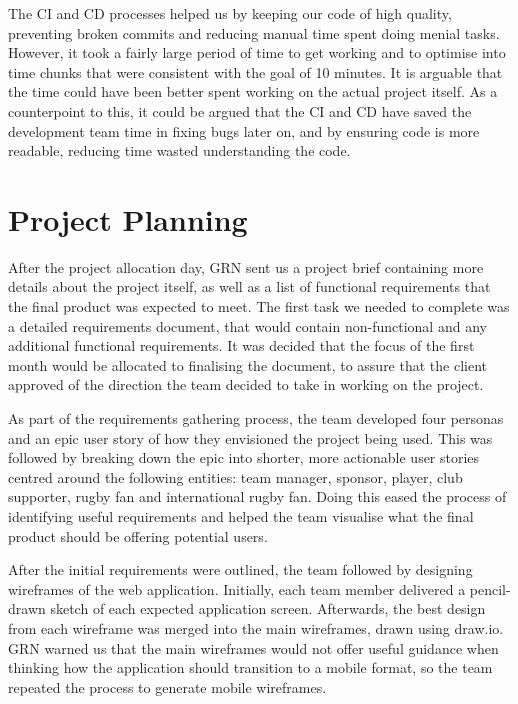 \documentclass{l3proj}
\begin{document}
The CI and CD processes helped us by keeping our code of high quality, preventing broken commits and reducing
 manual time spent doing menial tasks. However, it took a fairly large period of time to get working and to
 optimise into time chunks that were consistent with the goal of 10 minutes. It is arguable that the time
 could have been better spent working on the actual project itself. As a counterpoint to this, it could be
 argued that the CI and CD have saved the development team time in fixing bugs later on, and by ensuring code is more
 readable, reducing time wasted understanding the code.

\section{Project Planning} %
\label{sec:planning}

After the project allocation day, GRN sent us a project brief containing
 more details about the project itself, as well as a list of functional
 requirements that the final product was expected to meet. The first
 task we needed to complete was a detailed requirements document, that would
 contain non-functional and any additional functional requirements. It was
 decided that the focus of the first month would be allocated to finalising
 the document, to assure that the client approved of the direction
 the team decided to take in working on the project.

As part of the requirements gathering process, the team developed four personas
 and an epic user story of how they envisioned the project being used. This was followed by
 breaking down the epic into shorter, more actionable user stories centred around the following entities: team manager,
 sponsor, player, club supporter, rugby fan and international rugby fan. Doing
 this eased the process of identifying useful requirements and helped the team
 visualise what the final product should be offering potential users.

After the initial requirements were outlined, the team followed by designing
 wireframes of the web application. Initially, each team member delivered a
 pencil-drawn sketch of each expected application screen. Afterwards, the
 best design from each wireframe was merged into the main wireframes, drawn
 using draw.io. GRN warned us that the main wireframes would not offer useful
 guidance when thinking how the application should transition to a mobile format,
 so the team repeated the process to generate mobile wireframes.
\end{document}
